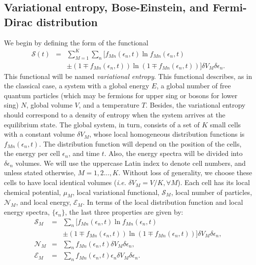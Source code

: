 \documentclass{article}
\newcommand{\Sm}{\Ss_M}
\newcommand{\de}{\delta}
\newcommand{\Ss}{\mathcal{S}}
\begin{document}
\subsection{Variational entropy, Bose-Einstein, and Fermi-Dirac distribution}

We begin by defining the form of the functional 
\begin{eqnarray}
    \Ss (t)&=&\sum_{M=1}^{K} \sum_{n} [ f_{Mn}(\epsilon_{n},t) \ln f_{Mn}(\epsilon_{n},t)\nonumber \\
    &&\pm (1 \mp f_{Mn}(\epsilon_{n},t)) \ln (1 \mp f_{Mn}(\epsilon_{n},t)) ]   \delta V_M \delta \epsilon_n \label{entropy}.
\end{eqnarray}
This functional will be named \textit{variational entropy}.
This functional describes, as in the classical case, a system with a global energy $E$, a global number of free
quantum particles (which may be fermions for upper sing or bosons for lower sing) $N$, global volume $V$, and a temperature $T$. 
Besides, the variational entropy should correspond to a density of entropy when the system arrives at the equilibrium state. The
global system, in turn, consists of a set of $K$ small cells with a constant volume $\delta V_M$, whose local homogeneous distribution functions is $f_{Mn}(\epsilon_{n},t)$. The distribution function will depend on the position of the cells, the energy per cell $\epsilon_{n}$, and time $t$. Also, the energy spectra will be divided into $\delta \epsilon_n$ volumes. We will use the uppercase Latin index to denote cell numbers, and unless stated otherwise, $M = 1, 2 . . . , K$. Without loss of generality, we choose these cells to have
local identical volumes (\textit{i.e.} $\delta V_M = V/K, \forall M$). Each cell has its local chemical potential, $\mu_M$, local
variational functional, $\Sm$, local number of particles, $\mathcal{N}_M$, and local energy, $\mathcal{E}_M$. In terms of the local distribution 
function and local energy spectra, $\{\epsilon_{n}\}$, the last three properties are given by:
\begin{eqnarray}
    \Sm &=&  \sum_{n} [ f_{Mn}(\epsilon_{n},t) \ln f_{Mn}(\epsilon_{n},t)\nonumber \\
    &&\pm (1 \mp f_{Mn}(\epsilon_{n},t)) \ln (1 \mp f_{Mn}(\epsilon_{n},t)) ] \de V_M \delta \epsilon_n \label{entropycell},\\
    {\mathcal{N}}_M&=& \sum_{n}f_{Mn}(\epsilon_{n} ,t) \de V_M \delta \epsilon_n, \nonumber \\
{\mathcal{E}}_M&=& \sum_{n}f_{Mn}(\epsilon_{n},t)\epsilon_{n} \de V_M \delta \epsilon_n.
\end{eqnarray}
\end{document}
